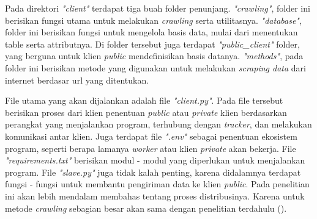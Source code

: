 Pada direktori \emph{"client"} terdapat tiga buah folder penunjang. \emph{"crawling"}, folder ini berisikan fungsi utama untuk melakukan \emph{crawling} serta utilitasnya. \emph{"database"}, folder ini berisikan fungsi untuk mengelola basis data, mulai dari menentukan table serta attributnya. Di folder tersebut juga terdapat \emph{"public\_client"} folder, yang berguna untuk klien \emph{public} mendefinisikan basis datanya. \emph{"methods"}, pada folder ini berisikan metode yang digunakan untuk melakukan \emph{scraping data} dari internet berdasar url yang ditentukan. 

File utama yang akan dijalankan adalah file \emph{"client.py"}. Pada file tersebut berisikan proses dari klien penentuan \emph{public} atau \emph{private} klien berdasarkan perangkat yang menjalankan program, terhubung dengan \emph{tracker}, dan melakukan komunikasi antar klien. Juga terdapat file \emph{".env"} sebagai penentuan ekosistem program, seperti berapa lamanya \emph{worker} atau klien \emph{private} akan bekerja. File \emph{"requirements.txt"} berisikan modul - modul yang diperlukan untuk menjalankan program. File \emph{"slave.py"} juga tidak kalah penting, karena didalamnya terdapat fungsi - fungsi untuk membantu pengiriman data ke klien \emph{public}. Pada penelitian ini akan lebih mendalam membahas tentang proses distribusinya. Karena untuk metode \emph{crawling} sebagian besar akan sama dengan penelitian terdahulu (\cite{lazuardy2023search}).
\clearpage

